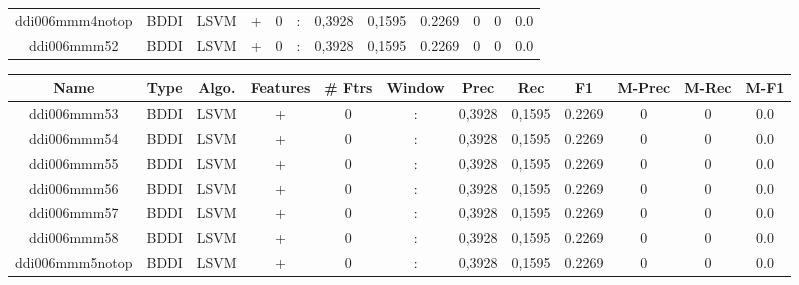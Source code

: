 \documentclass[a4paper]{article}
\begin{document}
\begin{landscape}
\begin{center}
\begin{tabular}{ |c|c|c|c|c|c|c|c|c|c|c|c|}
 
 	
 	\small{ ddi006mmm4notop } & BDDI & LSVM & +  &  0 &  :  &  0,3928 & 0,1595 & 0.2269  &  0 & 0 & 0.0 \\
 	

 
 	
 	\small{ ddi006mmm52 } & BDDI & LSVM & +  &  0 &  :  &  0,3928 & 0,1595 & 0.2269  &  0 & 0 & 0.0 \\
 	
 \hline
\end{tabular}
\end{center}




\begin{center}
\begin{tabular}{ |c|c|c|c|c|c|c|c|c|c|c|c|} 
 \hline
 	Name & Type & Algo. & Features & \# Ftrs & Window & Prec & Rec & F1 & M-Prec & M-Rec & M-F1\\
 \hline

 	

 
 	
 	\small{ ddi006mmm53 } & BDDI & LSVM & +  &  0 &  :  &  0,3928 & 0,1595 & 0.2269  &  0 & 0 & 0.0 \\
 	

 
 	
 	\small{ ddi006mmm54 } & BDDI & LSVM & +  &  0 &  :  &  0,3928 & 0,1595 & 0.2269  &  0 & 0 & 0.0 \\
 	

 
 	
 	\small{ ddi006mmm55 } & BDDI & LSVM & +  &  0 &  :  &  0,3928 & 0,1595 & 0.2269  &  0 & 0 & 0.0 \\
 	

 
 	
 	\small{ ddi006mmm56 } & BDDI & LSVM & +  &  0 &  :  &  0,3928 & 0,1595 & 0.2269  &  0 & 0 & 0.0 \\
 	

 
 	
 	\small{ ddi006mmm57 } & BDDI & LSVM & +  &  0 &  :  &  0,3928 & 0,1595 & 0.2269  &  0 & 0 & 0.0 \\
 	

 
 	
 	\small{ ddi006mmm58 } & BDDI & LSVM & +  &  0 &  :  &  0,3928 & 0,1595 & 0.2269  &  0 & 0 & 0.0 \\
 	

 
 	
 	\small{ ddi006mmm5notop } & BDDI & LSVM & +  &  0 &  :  &  0,3928 & 0,1595 & 0.2269  &  0 & 0 & 0.0 \\
 	


\end{tabular}
\end{center}
\end{landscape}
\end{document}
